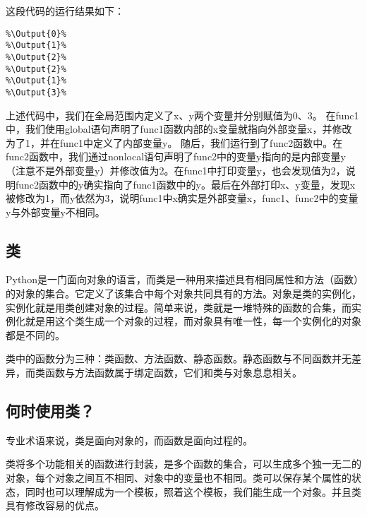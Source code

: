 这段代码的运行结果如下：
\begin{lstlisting}
%\Output{0}%
%\Output{1}%
%\Output{2}%
%\Output{2}%
%\Output{1}%
%\Output{3}%
\end{lstlisting}

上述代码中，我们在全局范围内定义了x、y两个变量并分别赋值为0、3。
在func1中，我们使用global语句声明了func1函数内部的x变量就指向外部变量x，并修改为了1，并在func1中定义了内部变量y。
随后，我们运行到了func2函数中。在func2函数中，我们通过nonlocal语句声明了func2中的变量y指向的是内部变量y（注意不是外部变量y）并修改值为2。在func1中打印变量y，也会发现值为2，说明func2函数中的y确实指向了func1函数中的y。最后在外部打印x、y变量，发现x被修改为1，而y依然为3，说明func1中x确实是外部变量x，func1、func2中的变量y与外部变量y不相同。

\subsection{类}
Python是一门面向对象的语言，而类是一种用来描述具有相同属性和方法（函数）的对象的集合。它定义了该集合中每个对象共同具有的方法。对象是类的实例化，实例化就是用类创建对象的过程。简单来说，类就是一堆特殊的函数的合集，而实例化就是用这个类生成一个对象的过程，而对象具有唯一性，每一个实例化的对象都是不同的。

类中的函数分为三种：类函数、方法函数、静态函数。静态函数与不同函数并无差异，而类函数与方法函数属于绑定函数，它们和类与对象息息相关。

\subsection{何时使用类？}
专业术语来说，类是面向对象的，而函数是面向过程的。

类将多个功能相关的函数进行封装，是多个函数的集合，可以生成多个独一无二的对象，每个对象之间互不相同、对象中的变量也不相同。类可以保存某个属性的状态，同时也可以理解成为一个模板，照着这个模板，我们能生成一个对象。并且类具有修改容易的优点。

